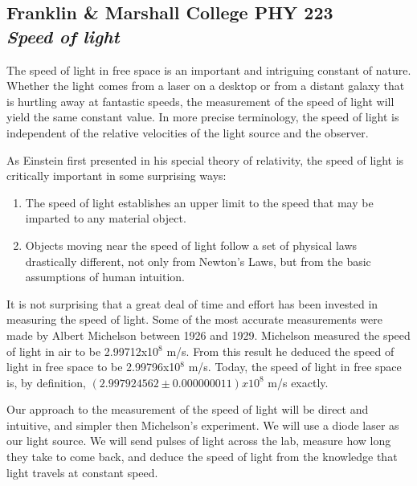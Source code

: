 \documentclass[11pt]{article}
\begin{document}
\begin{center}
\section*{
Franklin \& Marshall College \hfill PHY 223\\
\bigskip
{\Large \it Speed of light}}
\end{center}

The speed of light in free space is an important and intriguing constant of
nature. Whether the light comes from a laser on a desktop or from a distant
galaxy that is hurtling away at fantastic speeds, the measurement of the speed
of light will yield the same constant value. In more precise terminology, the
speed of light is independent of the relative velocities of the light source and
the observer.

As Einstein first presented in his special theory of relativity, the speed of
light is critically important in some surprising ways:

\begin{enumerate}
 \item The speed of light establishes an upper limit to the speed that may be 
 imparted to any material object.
 
 \item Objects moving near the speed of light follow a set of physical laws 
 drastically different, not only from Newton’s Laws, but from the basic 
 assumptions of human intuition.
\end{enumerate}

It is not surprising that a great deal of time and effort has been invested in
measuring the speed of light. Some of the most accurate measurements were made
by Albert Michelson between 1926 and 1929. Michelson measured the speed of light
in air to be 2.99712x10$^8$ m/s. From this result he deduced the speed of light
in free space to be 2.99796x10$^8$ m/s. Today, the speed of light in free space
is, by definition, $(2.997924562 \pm 0.000000011)x10^8$ m/s exactly.

Our approach to the measurement of the speed of light will be direct and
intuitive, and simpler then Michelson's experiment. We will use a diode laser as
our light source. We will send pulses of light across the lab, measure how long
they take to come back, and deduce the speed of light from the knowledge that
light travels at constant speed.

\vspace{5mm}
\end{document}
